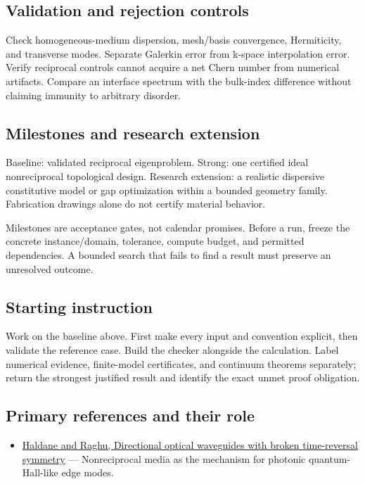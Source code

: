 \documentclass[
  11pt,
]{article}
\providecommand{\tightlist}{%
  \setlength{\itemsep}{0pt}\setlength{\parskip}{0pt}}
\begin{document}
\subsection{Validation and rejection controls}

Check homogeneous-medium dispersion, mesh/basis convergence,
Hermiticity, and transverse modes. Separate Galerkin error from k-space
interpolation error. Verify reciprocal controls cannot acquire a net
Chern number from numerical artifacts. Compare an interface spectrum
with the bulk-index difference without claiming immunity to arbitrary
disorder.

\subsection{Milestones and research extension}

Baseline: validated reciprocal eigenproblem. Strong: one certified ideal
nonreciprocal topological design. Research extension: a realistic
dispersive constitutive model or gap optimization within a bounded
geometry family. Fabrication drawings alone do not certify material
behavior.

Milestones are acceptance gates, not calendar promises. Before a run,
freeze the concrete instance/domain, tolerance, compute budget, and
permitted dependencies. A bounded search that fails to find a result
must preserve an unresolved outcome.

\subsection{Starting instruction}

Work on the baseline above. First make every input and convention
explicit, then validate the reference case. Build the checker alongside
the calculation. Label numerical evidence, finite-model certificates,
and continuum theorems separately; return the strongest justified result
and identify the exact unmet proof obligation.

\subsection{Primary references and their role}

\begin{itemize}
\tightlist
\item
  \href{https://journals.aps.org/prl/abstract/10.1103/PhysRevLett.100.013904}{Haldane
  and Raghu, Directional optical waveguides with broken time-reversal
  symmetry} --- Nonreciprocal media as the mechanism for photonic
  quantum-Hall-like edge modes.
\end{itemize}
\end{document}
